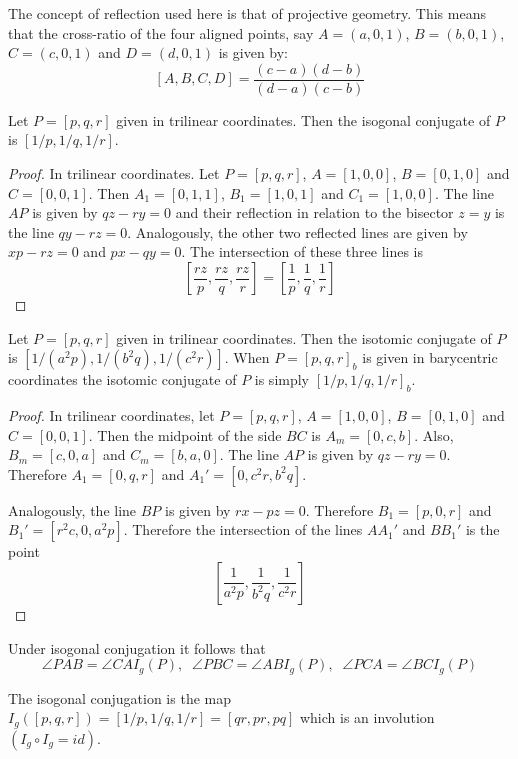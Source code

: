 	 \begin{remark}
 The concept of reflection used here is that of projective geometry. This means that the cross-ratio of the four aligned points, say $A=( a,0,1)$, $B=(b,0,1)$, $C=(c,0,1)$ and $D=(d,0,1)$ is given by:
 \[ [A,B,C,D]=\frac{(c-a)(d-b)}{(d-a)(c-b)}\]
 \end{remark}
	\begin{proposition}
	Let $P=[p,q,r]$ given in trilinear coordinates. Then the isogonal conjugate of $P$ is $[1/p,1/q,1/r]$.
	\end{proposition}
	
	\begin{proof} In trilinear coordinates. Let $P=[p,q,r]$, $A=[1,0,0]$, $B=[0,1,0] $ and $C=[0,0,1]$.
	Then $A_1=[0,1,1]$, $B_1=[1,0,1]$ and $C_1=[1,0,0]$. The line $AP$ is given by
	$q z - r y=0$ and their reflection in relation to the bisector $z=y$ is the line $  q y-r z=0$. Analogously, the other two reflected lines are given by $ x p-r z=0$ and $p x-q y=0$. The intersection of these three lines is 
	\[ [\frac{r z}{p},\frac{r z}{q},\frac{r z}{r}]= [\frac{1}{p},\frac{1}{q},\frac{1}{r}]\]
	\end{proof}

	 
	
		\begin{proposition}
	Let $P=[p,q,r]$ given in trilinear coordinates. Then the isotomic  conjugate of $P$ is $[1/(a^2 p),1/(b^2 q),1/(c^2 r)]$.
	When $P=[p,q,r]_b$ is given in barycentric coordinates   the isotomic conjugate of $P$ is simply $[1/p, 1/q, 1/r]_b$.
	\end{proposition}
 \begin{proof}
 In trilinear coordinates,  let $P=[p,q,r]$, $A=[1,0,0]$, $B=[0,1,0] $ and $C=[0,0,1]$.
	Then the midpoint of the side $BC$ is $A_m=[0,c,b]$. Also, $B_m=[c,0,a]$ and $C_m=[b,a,0]$. The line $AP$ is given by
	$q z - r y=0$. Therefore $A_1=[0,q,r]$ and $A_1'=[0,c^2r,b^2q]$. 
 
	Analogously, the   line $BP$ is given by $   r x-p z=0  $. Therefore $B_1=[ p,0,r]$ and
	$B_1'=[r^ 2c,0,a^2p]$.  
	Therefore the intersection of the   lines $AA_1'$ and $BB_1'$ is the point
	\[[\frac{1}{  a^2 p},\frac{1}{b^2 q},\frac{1}{c^2 r} ] \]
 \end{proof}
 
	\begin{remark}
	Under isogonal conjugation it follows that
	\[\angle P A B = \angle C A I_g(P),\;\; \angle P B C = \angle A B I_g(P),\;\; \angle P C A = \angle B  C I_g(P)\]
	\end{remark}
	The isogonal conjugation is the map $I_g([p,q,r])=[1/p,1/q,1/r]=[q r,p r,p q]$ which is an involution $(I_g\circ I_g=id)$.
	
